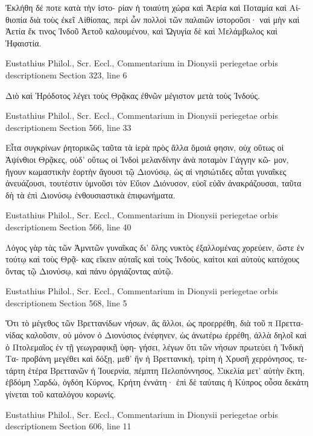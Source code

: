 \documentclass[12pt,letterpaper,twoside,final]{memoir}
\begin{document}
\begin{greek}
                      Ἐκλήθη δέ ποτε κατὰ τὴν ἱστο-
ρίαν ἡ τοιαύτη χώρα καὶ Ἀερία καὶ Ποταμία καὶ Αἰ-
θιοπία διὰ τοὺς ἐκεῖ Αἰθίοπας, περὶ ὧν πολλοὶ τῶν 
παλαιῶν ἱστοροῦσι· ναὶ μὴν καὶ Ἀετία ἔκ τινος Ἰνδοῦ 
Ἀετοῦ καλουμένου, καὶ Ὠγυγία δὲ καὶ Μελάμβωλος 
καὶ Ἡφαιστία. 



Eustathius Philol., Scr. Eccl., Commentarium in Dionysii periegetae orbis descriptionem 
Section 323, line 6

                      Διὸ καὶ Ἡρόδοτος λέγει τοὺς 
Θρᾷκας ἐθνῶν μέγιστον μετὰ τοὺς Ἰνδούς. 



Eustathius Philol., Scr. Eccl., Commentarium in Dionysii periegetae orbis descriptionem 
Section 566, line 33

Εἶτα συγκρίνων ῥητορικῶς ταῦτα τὰ ἱερὰ πρὸς ἄλλα 
ὅμοιά φησιν, οὐχ οὕτως οἱ Ἀψίνθιοι Θρᾷκες, οὐδ' 
οὕτως οἱ Ἰνδοὶ μελανδίνην ἀνὰ ποταμὸν Γάγγην κῶ-
μον, ἤγουν κωμαστικὴν ἑορτὴν ἄγουσι τῷ Διονύσῳ, 
ὡς αἱ νησιώτιδες αὗται γυναῖκες ἀνευάζουσι, τουτέστιν 
ὑμνοῦσι τὸν Εὔιον Διόνυσον, εὐοῖ εὐᾶν ἀνακράζουσαι, 
ταῦτα δὴ τὰ ἐπὶ Διονύσῳ ἐνθουσιαστικὰ ἐπιφωνήματα. 



Eustathius Philol., Scr. Eccl., Commentarium in Dionysii periegetae orbis descriptionem 
Section 566, line 40

Λόγος γὰρ τὰς τῶν Ἀμνιτῶν γυναῖκας δι' ὅλης νυκτὸς   
ἐξαλλομένας χορεύειν, ὥστε ἐν τούτῳ καὶ τοὺς Θρᾷ-
κας εἴκειν αὐταῖς καὶ τοὺς Ἰνδοὺς, καίτοι καὶ αὐτοὺς 
κατόχους ὄντας τῷ Διονύσῳ, καὶ πάνυ ὀργιάζοντας 
αὐτῷ. 



Eustathius Philol., Scr. Eccl., Commentarium in Dionysii periegetae orbis descriptionem 
Section 568, line 5

Ὅτι τὸ μέγεθος τῶν Βρεττανίδων νήσων, ἃς 
ἄλλοι, ὡς προερρέθη, διὰ τοῦ π Πρεττανίδας καλοῦσιν, 
οὐ μόνον ὁ Διονύσιος ἐνέφηνεν, ὡς ἀνωτέρω ἐρρέθη, 
ἀλλὰ δηλοῖ καὶ ὁ Πτολεμαῖος ἐν τῇ γεωγραφικῇ ὑφη-
γήσει, λέγων ὅτι τῶν νήσων πρωτεύει ἡ Ἰνδικὴ Τα-
προβάνη μεγέθει καὶ δόξῃ, μεθ' ἣν ἡ Βρεττανικὴ, 
τρίτη ἡ Χρυσῆ χερρόνησος, τετάρτη ἑτέρα Βρεττανῶν   
ἡ Ἰουερνία, πέμπτη Πελοπόννησος, Σικελία μετ' 
αὐτὴν ἕκτη, ἑβδόμη Σαρδὼ, ὀγδόη Κύρνος, Κρήτη 
ἐννάτη· ἐπὶ δὲ ταύταις ἡ Κύπρος οὖσα δεκάτη γίνεται 
τοῦ καταλόγου κορωνίς. 



Eustathius Philol., Scr. Eccl., Commentarium in Dionysii periegetae orbis descriptionem 
Section 606, line 11


\end{greek}
\end{document}
